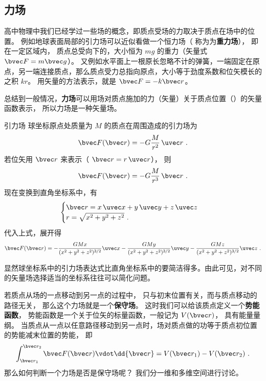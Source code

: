 

\subsection{力场}
高中物理中我们已经学过一些场的概念，即质点受场的力取决于质点在场中的位置。 例如地球表面局部的引力场可以近似看做一个恒力场（ 称为为\textbf{重力场}）， 即在一定区域内， 质点总受向下的，大小恒为 $mg$ 的重力（矢量式 $\bvec F = m\bvec g$）。 又例如水平面上一根原长忽略不计的弹簧，一端固定在原点，另一端连接质点，那么质点受力总指向原点，大小等于劲度系数和位矢模长的之积 $kr$。 用矢量的方法表示，就是 $\bvec F = -k\bvec r$。

总结到一般情况，\textbf{力场}可以用场对质点施加的力（矢量）关于质点位置（）的矢量函数表示， 所以力场是一种矢量场。


\begin{example}{引力场}\label{ex_V_1}
球坐标原点处质量为 $M$ 的质点在周围造成的引力场为
\begin{equation}
\bvec F(\bvec r) =  - G\frac{M}{r^2}\,\uvec r~.
\end{equation} 
若位矢用 $\bvec r$ 来表示（ $\bvec r = r\,\uvec r$）， 则
\begin{equation}
\bvec F(\bvec r) =  - G\frac{M}{r^3}\,\bvec r~.
\end{equation}
现在变换到直角坐标系中，有
\begin{equation}
\begin{cases}
\bvec r = x\,\uvec x + y\,\uvec y + z\,\uvec z\\
r = \sqrt{x^2 + y^2 + z^2} ~.
\end{cases}
\end{equation} 
代入上式，展开得
\begin{equation}
\bvec F(\bvec r) =  - \frac{GMx}{(x^2+y^2+z^2)^{3/2}}\uvec x - \frac{GMy}{(x^2 +y^2+z^2)^{3/2}}\uvec y - \frac{GMz}{(x^2+y^2+z^2)^{3/2}}\uvec z ~.
\end{equation} 

显然球坐标系中的引力场表达式比直角坐标系中的要简洁得多。由此可见，对不同的矢量场选择适当的坐标系往往可以简化问题。
\end{example}

若质点从场的一点移动到另一点的过程中，  只与初末位置有关，而与质点移动的路径无关， 那么这个力场就是一个\textbf{保守场}。 这时我们可以给该质点定义一个\textbf{势能函数}， 势能函数是一个关于位矢的标量函数，一般记为 $V(\bvec r)$， 具有能量量纲。 当质点从一点以任意路径移动到另一点时，场对质点做的功等于质点初位置的势能减末位置的势能， 即
\begin{equation}\label{eq_V_1}
\int_{\bvec r_1}^{\bvec r_2} \bvec F(\bvec r) \vdot \dd{\bvec r} = V(\bvec r_1)-V(\bvec r_2)~.
\end{equation}
那么如何判断一个力场是否是保守场呢？ 我们分一维和多维空间进行讨论。

